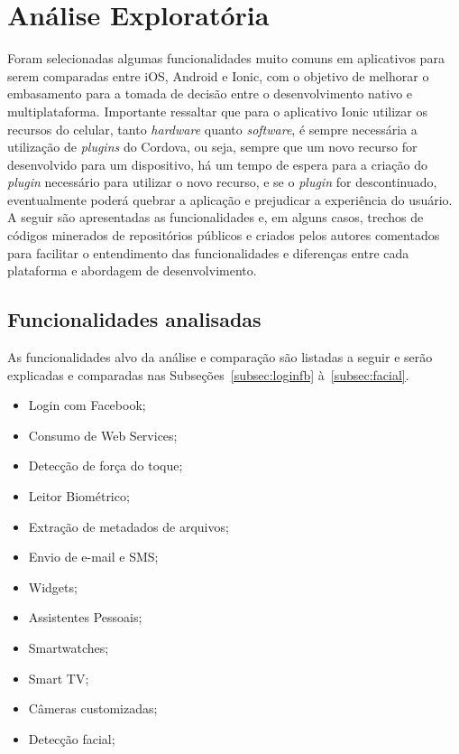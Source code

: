 \chapter{Análise Exploratória} \label{cap:analise_exploratoria}


Foram selecionadas algumas funcionalidades muito comuns em aplicativos para serem comparadas entre iOS, Android e Ionic, com o objetivo de melhorar o embasamento para a tomada de decisão entre o desenvolvimento 
nativo e multiplataforma. Importante ressaltar que para o aplicativo Ionic utilizar os recursos do celular, tanto \textit{hardware} quanto \textit{software}, é sempre necessária a utilização de 
\textit{plugins} do Cordova, ou seja, sempre que um novo recurso for desenvolvido para um dispositivo, há um tempo de espera para a criação do \textit{plugin} necessário para utilizar o novo recurso, 
e se o \textit{plugin} for descontinuado, eventualmente poderá quebrar a aplicação e prejudicar a experiência do usuário. A seguir são apresentadas as funcionalidades e, em alguns casos, trechos de códigos minerados 
de repositórios públicos e criados pelos autores comentados para facilitar o entendimento das funcionalidades e diferenças entre cada plataforma e abordagem de desenvolvimento. 

\section{Funcionalidades analisadas}\label{sec:intro_analise_exp}

As funcionalidades alvo da análise e comparação são listadas a seguir e serão explicadas e comparadas nas Subseções~\ref{subsec:loginfb} à~\ref{subsec:facial}. 

\begin{itemize}
	\item Login com Facebook;
	\item Consumo de Web Services;
	\item Detecção de força do toque;
	\item Leitor Biométrico;
	\item Extração de metadados de arquivos;
	\item Envio de e-mail e SMS;
	\item Widgets;
	\item Assistentes Pessoais;
	\item Smartwatches;
	\item Smart TV;
	\item Câmeras customizadas;
	\item Detecção facial;
\end{itemize}

